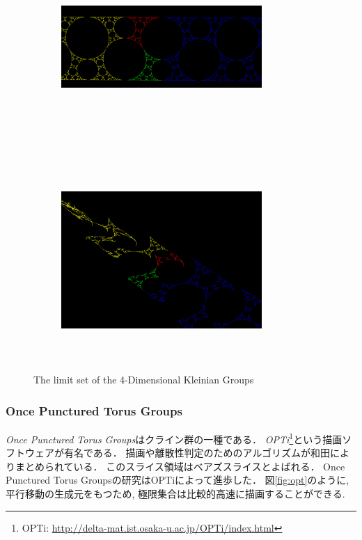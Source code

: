 \begin{figure}[h!tbp]
 \begin{subfigure}{0.49\hsize}
   \begin{center}
    \includegraphics[width=3in, height=3in, keepaspectratio]{../img/klein/sakugawa1.pdf}
    \caption{}
    \label{fig:sakugawa1}
   \end{center}
 \end{subfigure}
 \hspace*{\fill}
 \begin{subfigure}{0.49\hsize}
   \begin{center}
    \includegraphics[width=3in, height=3in, keepaspectratio]{../img/klein/sakugawa2.pdf}
    \caption{}
    \label{fig:sakugawa2}
   \end{center}
 \end{subfigure}
 \caption{The limit set of the 4-Dimensional Kleinian Groups}
 \label{fig:sakugawa}
\end{figure}

\subsubsection{Once Punctured Torus Groups}
{\it Once Punctured Torus Groups}はクライン群の一種である．
{\it OPTi}\footnote{OPTi: \url{http://delta-mat.ist.osaka-u.ac.jp/OPTi/index.html}}という描画ソフトウェアが有名である．
描画\cite{OPTiDrawing}や離散性判定\cite{OPTiDiscrete}のためのアルゴリズムが和田によりまとめられている．
このスライス領域はベアズスライスとよばれる．
Once Punctured Torus Groupsの研究はOPTiによって進歩した．
図\ref{fig:opt}のように, 平行移動の生成元をもつため, 極限集合は比較的高速に描画することができる.


